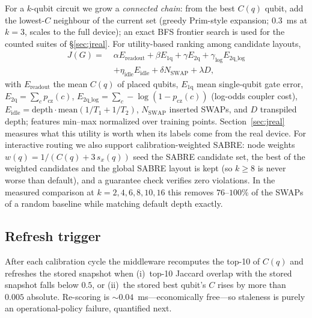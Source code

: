 \documentclass[journal,10pt,twocolumn]{IEEEtran}
\begin{document}
For a $k$-qubit circuit we grow a \emph{connected chain}: from the best $C(q)$ qubit, add the lowest-$C$
neighbour of the current set (greedy Prim-style expansion; $0.3$~ms at $k{=}3$, scales to the full device);
an exact BFS frontier search is used for the counted suites of \S\ref{sec:jreal}. For utility-based ranking among
candidate layouts,
\begin{equation}
\begin{aligned}
J(G)=\;&\alpha E_{\mathrm{readout}}+\beta E_{\mathrm{1q}}+\gamma E_{\mathrm{2q}}
+\gamma_{\log}E_{\mathrm{2q\_log}}\\
&+\eta_{\mathrm{idle}}E_{\mathrm{idle}}+\delta N_{\mathrm{SWAP}}+\lambda D,
\end{aligned}
\label{eq:j7}
\end{equation}
with $E_{\mathrm{readout}}$ the mean $C(q)$ of placed qubits, $E_{\mathrm{1q}}$ mean single-qubit gate error,
$E_{\mathrm{2q}}=\sum_c p_{\mathrm{cz}}(c)$, $E_{\mathrm{2q\_log}}=\sum_c-\log(1-p_{\mathrm{cz}}(c))$ (log-odds
coupler cost), $E_{\mathrm{idle}}=\mathrm{depth}\cdot\mathrm{mean}(1/T_1+1/T_2)$, $N_{\mathrm{SWAP}}$ inserted
SWAPs, and $D$ transpiled depth; features min--max normalized over training points. Section~\ref{sec:jreal}
measures what this utility is worth when its labels come from the real device. For interactive routing we also
support calibration-weighted SABRE: node weights $w(q)=1/(C(q)+3\,s_x(q))$ seed the SABRE candidate set, the best
of the weighted candidates and the global SABRE layout is kept (so $k\ge8$ is never worse than default), and a
guarantee check verifies zero violations. In the measured comparison at $k=2,4,6,8,10,16$ this removes
$76$--$100\%$ of the SWAPs of a random baseline while matching default depth exactly.

\subsection{Refresh trigger}
\label{sec:trigger}
After each calibration cycle the middleware recomputes the top-10 of $C(q)$ and refreshes the stored snapshot when
(i)~top-10 Jaccard overlap with the stored snapshot falls below $0.5$, or (ii)~the stored best qubit's $C$ rises by
more than $0.005$ absolute. Re-scoring is $\sim0.04$~ms---economically free---so staleness is purely an
operational-policy failure, quantified next.
\end{document}
